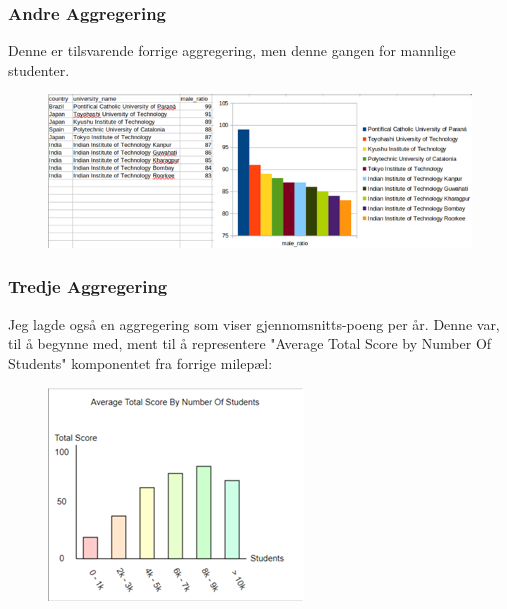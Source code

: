 \subsubsection{Andre Aggregering}
Denne er tilsvarende forrige aggregering, men denne gangen for mannlige studenter.

\FigureCounter
\begin{figure}[H]
    \includegraphics[width=\textwidth]{images/milepael5/resUniMaleRatio.png}
\end{figure}

\subsubsection{Tredje Aggregering}

Jeg lagde også en aggregering som viser gjennomsnitts-poeng per år. Denne var, til å begynne med, ment til å representere "Average Total Score by Number Of Students" komponentet fra forrige milepæl:

\FigureCounter
\begin{figure}[H]
    \includegraphics[width=\textwidth]{images/milepael5/avgScoreTotStudents.png}
\end{figure}

